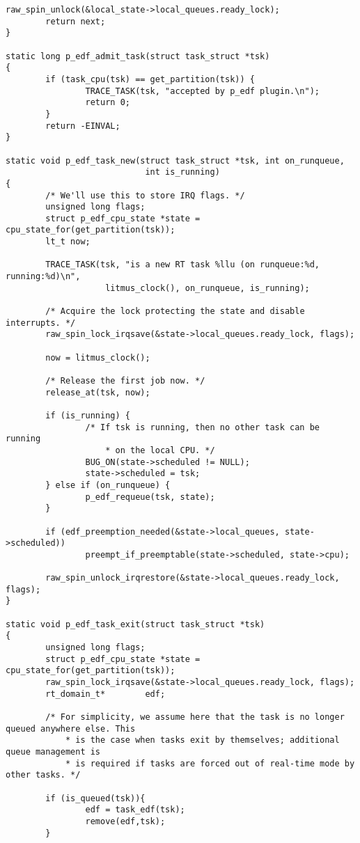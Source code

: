 \begin{lstlisting}[style=cstyle, caption=linux/litmus/sched\_p\_edf.c, label=annexe:p-edf]
        raw_spin_unlock(&local_state->local_queues.ready_lock);
        return next;
}

static long p_edf_admit_task(struct task_struct *tsk)
{
        if (task_cpu(tsk) == get_partition(tsk)) {
                TRACE_TASK(tsk, "accepted by p_edf plugin.\n");
                return 0;
        }
        return -EINVAL;
}

static void p_edf_task_new(struct task_struct *tsk, int on_runqueue,
                            int is_running)
{
        /* We'll use this to store IRQ flags. */
        unsigned long flags;
        struct p_edf_cpu_state *state = cpu_state_for(get_partition(tsk));
        lt_t now;

        TRACE_TASK(tsk, "is a new RT task %llu (on runqueue:%d, running:%d)\n",
                    litmus_clock(), on_runqueue, is_running);

        /* Acquire the lock protecting the state and disable interrupts. */
        raw_spin_lock_irqsave(&state->local_queues.ready_lock, flags);

        now = litmus_clock();

        /* Release the first job now. */
        release_at(tsk, now);

        if (is_running) {
                /* If tsk is running, then no other task can be running
                    * on the local CPU. */
                BUG_ON(state->scheduled != NULL);
                state->scheduled = tsk;
        } else if (on_runqueue) {
                p_edf_requeue(tsk, state);
        }

        if (edf_preemption_needed(&state->local_queues, state->scheduled))
                preempt_if_preemptable(state->scheduled, state->cpu);

        raw_spin_unlock_irqrestore(&state->local_queues.ready_lock, flags);
}

static void p_edf_task_exit(struct task_struct *tsk)
{
        unsigned long flags;
        struct p_edf_cpu_state *state = cpu_state_for(get_partition(tsk));
        raw_spin_lock_irqsave(&state->local_queues.ready_lock, flags);
        rt_domain_t*		edf;

        /* For simplicity, we assume here that the task is no longer queued anywhere else. This
            * is the case when tasks exit by themselves; additional queue management is
            * is required if tasks are forced out of real-time mode by other tasks. */
        
        if (is_queued(tsk)){
                edf = task_edf(tsk);
                remove(edf,tsk);
        }


\end{lstlisting}
